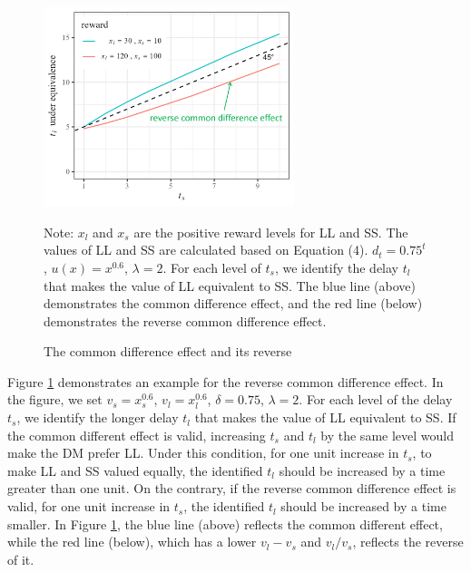 \documentclass[
  12pt,
]{article}
\begin{document}
\begin{figure}[h]
  \centering   
  \includegraphics[width=0.65\textwidth]{figures/common_diff.png}   
  \caption{The common difference effect and its reverse}
  \vspace{8pt}
  \begin{minipage}{1.0\textwidth}
{\par\footnotesize Note: $x_l$ and $x_s$ are the positive reward levels for LL and SS. The values of LL and SS are calculated based on Equation (4). $d_t=0.75^t$, $u(x)=x^{0.6}$, $\lambda=2$. For each level of $t_s$, we identify the delay $t_l$ that makes the value of LL equivalent to SS. The blue line (above) demonstrates the common difference effect, and the red line (below) demonstrates the reverse common difference effect.}
\end{minipage}
  \label{fig:common_diff} 
\end{figure}

Figure \ref{fig:common_diff} demonstrates an example for the reverse
common difference effect. In the figure, we set \(v_s=x_s^{0.6}\),
\(v_l=x_l^{0.6}\), \(\delta=0.75\), \(\lambda=2\). For each level of the
delay \(t_s\), we identify the longer delay \(t_l\) that makes the value
of LL equivalent to SS. If the common different effect is valid,
increasing \(t_s\) and \(t_l\) by the same level would make the DM
prefer LL. Under this condition, for one unit increase in \(t_s\), to
make LL and SS valued equally, the identified \(t_l\) should be
increased by a time greater than one unit. On the contrary, if the
reverse common difference effect is valid, for one unit increase in
\(t_s\), the identified \(t_l\) should be increased by a time smaller.
In Figure \ref{fig:common_diff}, the blue line (above) reflects the
common different effect, while the red line (below), which has a lower
\(v_l-v_s\) and \(v_l/v_s\), reflects the reverse of it.
\end{document}
